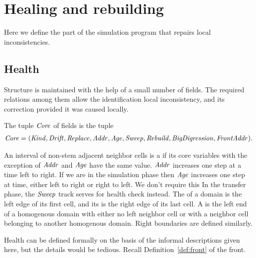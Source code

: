 \documentclass[11pt]{memoir}
\theoremstyle{definition} %
\newcommand{\fld}[1]{\ensuremath{\textit{#1\/}}}
\newcommand{\Addr}{\fld{Addr}}
\newcommand{\Age}{\fld{Age}} %
\newcommand{\BigDigression}{\fld{BigDigression}}
\newcommand{\Core}{\fld{Core}}
\newcommand{\Drift}{\fld{Drift}}
\newcommand{\FrontAddr}{\fld{FrontAddr}}
\newcommand{\Kind}{\fld{Kind}}
\newcommand{\Rebuild}{\fld{Rebuild}} %
\newcommand{\Replace}{\fld{Replace}}
\newcommand{\Sweep}{\fld{Sweep}} %
\begin{document}
\section{Healing and rebuilding}\label{sec:healing}

Here we define the part of the simulation program that repairs local inconsistencies.

\subsection{Health}            \label{sec:health}

Structure is maintained with the help of a small number of fields.
The required relations among them 
allow the identification local inconsistency, and its correction provided it was caused locally.

\begin{definition}\label{def:domains}
The tuple \( \Core \) of fields is the tuple
\begin{align*}
  \Core = (\Kind,\Drift,\Replace,\Addr,\Age,\Sweep,\Rebuild, %
  \BigDigression,\FrontAddr).
 \end{align*}

 An interval of non-stem adjacent neighbor cells is a  if
 its core variables with the exception of \( \Addr \) and \( \Age \) have the same value.
 \( \Addr \) increases one step at a time left to right.
 If we are in the simulation phase then \( \Age \) increases one step at time,
 either left to right or right to left.
 We don't require this In the transfer phase, the \( \Sweep \) track serves for health check instead.
The  of a domain is the left edge of its first cell, and its  is 
the right edge of its last cell.
A  is the left end of a homogenous domain with either no left neighbor cell
or with a neighbor cell belonging to another homogenous domain.
Right boundaries are defined similarly.
\end{definition}

Health can be defined formally on the basis of the informal descriptions given here,
but the details would be tedious.
Recall Definition~\ref{def:front} of the front.
\end{document}
